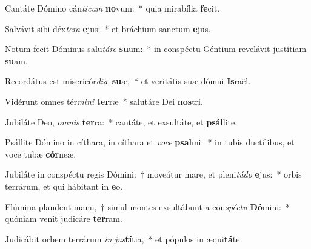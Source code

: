\item Cantáte Dómino cán\textit{ti}\textit{cum} \textbf{no}vum:~* quia mirabília \textbf{fe}cit.
\item Salvávit sibi déx\textit{te}\textit{ra} \textbf{e}jus:~* et bráchium sanctum \textbf{e}jus.
\item Notum fecit Dóminus salu\textit{tá}\textit{re} \textbf{su}um:~* in conspéctu Géntium revelávit justítiam \textbf{su}am.
\item Recordátus est misericór\textit{di}\textit{æ} \textbf{su}æ,~* et veritátis suæ dómui \textbf{Is}raël.
\item Vidérunt omnes tér\textit{mi}\textit{ni} \textbf{ter}ræ~* salutáre Dei \textbf{nos}tri.
\item Jubiláte Deo, \textit{om}\textit{nis} \textbf{ter}ra:~* cantáte, et exsultáte, et \textbf{psál}lite.
\item Psállite Dómino in cíthara, in cíthara et \textit{vo}\textit{ce} \textbf{psal}mi:~* in tubis ductílibus, et voce tubæ \textbf{cór}neæ.
\item Jubiláte in conspéctu regis Dómini:~† moveátur mare, et pleni\textit{tú}\textit{do} \textbf{e}jus:~* orbis terrárum, et qui hábitant in \textbf{e}o.
\item Flúmina plaudent manu,~† simul montes exsultábunt a con\textit{spéc}\textit{tu} \textbf{Dó}mini:~* quóniam venit judicáre \textbf{ter}ram.
\item Judicábit orbem terrárum \textit{in} \textit{jus}\textbf{tí}tia,~* et pópulos in æqui\textbf{tá}te.
